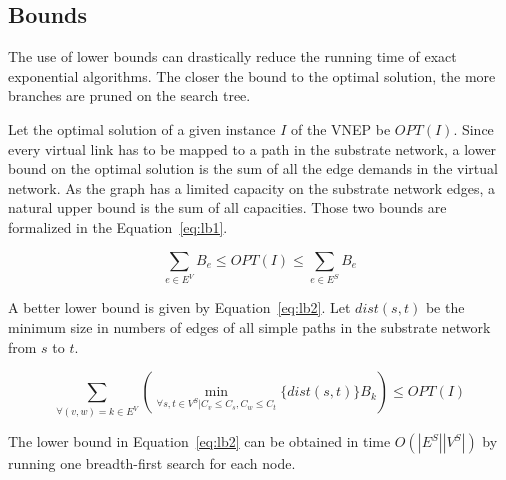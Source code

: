 
\subsection{Bounds}
The use of lower bounds can drastically reduce the running time of exact exponential algorithms. The closer the bound to the optimal solution, the more branches are pruned on the search tree.

Let the optimal solution of a given instance $I$ of the VNEP be $OPT(I)$. Since every virtual link has to be mapped to a path in the substrate network, a lower bound on the optimal solution is the sum of all the edge demands in the virtual network. As the graph has a limited capacity on the substrate network edges, a natural upper bound is the sum of all capacities. Those two bounds are formalized in the Equation~\ref{eq:lb1}.

\begin{equation}
  \sum\limits_{e \in E^{V}} B_{e} \leq OPT(I) \leq \sum\limits_{e \in E^{S}} B_{e}
  \label{eq:lb1}
\end{equation}

A better lower bound is given by Equation~\ref{eq:lb2}. Let $dist(s, t)$ be the minimum size in numbers of edges of all simple paths in the substrate network from $s$ to $t$.

\begin{equation}
  \sum\limits_{\forall(v,w) = k \in E^{V}} 
  ( \min\limits_{\forall s,t \in V^{S} | C_{v} \leq C_{s}, C_{w} \leq C_{t} } \{ dist(s,t) \} 
  B_{k} ) \leq OPT(I) \label{eq:lb2}
\end{equation}

The lower bound in Equation~\ref{eq:lb2} can be obtained in time $O(|E^{S}||V^{S}|)$ by running one breadth-first search for each node.

